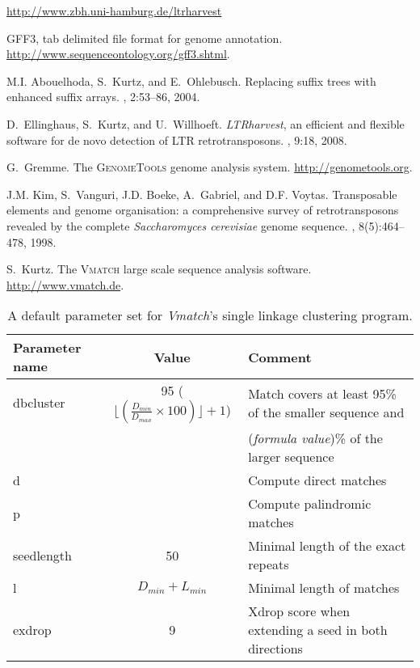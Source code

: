 \documentclass[12pt,titlepage]{article}
\newcommand{\LTRharvest}{\textit{LTRharvest}\xspace}
\begin{document}
%
%
\begin{thebibliography}{1}

  \url{http://www.zbh.uni-hamburg.de/ltrharvest}

\textsc{GFF3}, tab delimited file format for genome annotation.
  \url{http://www.sequenceontology.org/gff3.shtml}.

M.I. Abouelhoda, S.~Kurtz, and E.~Ohlebusch.
\newblock Replacing suffix trees with enhanced suffix arrays.
, 2:53--86, 2004.

D.~Ellinghaus, S.~Kurtz, and U.~Willhoeft.
\newblock \LTRharvest, an efficient and flexible software for de novo
  detection of \normalsize{LTR} retrotransposons.
, 9:18, 2008.

G.~Gremme.
\newblock The \textsc{GenomeTools} genome analysis system.
  \url{http://genometools.org}.

J.M. Kim, S.~Vanguri, J.D. Boeke, A.~Gabriel, and D.F. Voytas.
\newblock Transposable elements and genome organisation: a comprehensive survey
  of retrotransposons revealed by the complete \textit{Saccharomyces
  cerevisiae} genome sequence.
, 8(5):464--478, 1998.

S.~Kurtz.
\newblock The \textsc{Vmatch} large scale sequence analysis software.
  \url{http://www.vmatch.de}.

\end{thebibliography}

\begin{table}
\caption{A default parameter set for \textit{Vmatch}'s single linkage
  clustering program.}
\vspace{0.25cm}
\begin{tabular}[h!]{lcl}\hline
Parameter name & Value & Comment\\\hline
dbcluster    & 95 ($\lfloor(\frac{D_{min}}{D_{max}} \times 100)\rfloor + 1$) & Match covers at least 95\% of the smaller sequence and\\
             &                                                 & (\textit{formula value})\% of the larger sequence\\
d  & & Compute direct matches\\
p & & Compute palindromic matches\\
seedlength & 50 & Minimal length of the exact repeats\\
l & $D_{min} + L_{min}$ & Minimal length of matches\\
exdrop & 9 & Xdrop score when extending a seed in both directions\\\hline
\end{tabular}
\label{parameters-cluster-default}
\end{table}
\end{document}
